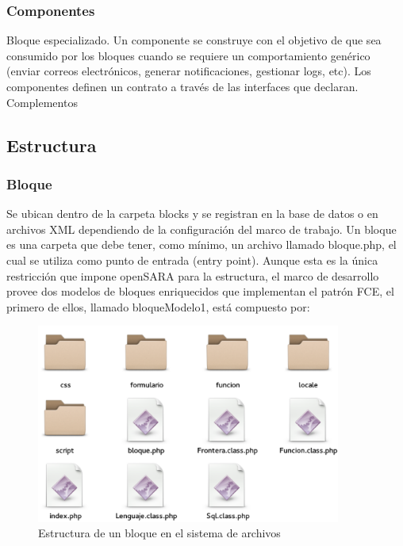 \subsubsection{Componentes}
Bloque especializado. Un componente se construye con el objetivo de que sea consumido por los bloques cuando se requiere un comportamiento genérico (enviar correos electrónicos, generar notificaciones, gestionar logs, etc). Los componentes definen un contrato a través de las interfaces que declaran.
Complementos

\subsection{Estructura}

\subsubsection{Bloque}
Se ubican dentro de la carpeta blocks y se registran en la base de datos o en archivos XML dependiendo de la configuración del marco de trabajo. Un bloque es una carpeta que debe tener, como mínimo, un archivo llamado bloque.php, el cual se utiliza como punto de entrada (entry point). Aunque esta es la única restricción que impone  openSARA para la estructura, el marco de desarrollo provee dos modelos de bloques enriquecidos que implementan el patrón FCE, el primero de ellos, llamado bloqueModelo1, está compuesto por:


\begin{figure}
 \centering
 \includegraphics[width=100mm]{carpetaBloque.png}
 \caption{Estructura de un bloque en el sistema de archivos}
 \label{aplicaciones_sitem}
\end{figure}

